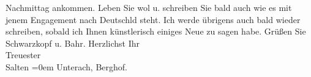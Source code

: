 \begin{ledgroupsized}[t]{13cm}
               Nachmittag ankommen. Leben Sie wol u. schreiben Sie bald auch wie es mit jenem
               Engagement nach Deutschld steht. \pend
           \pstart
           Ich werde übrigens auch bald wieder schreiben, sobald ich Ihnen künstlerisch ei{\pb}niges Neue zu sagen habe. Grüßen
               Sie Schwarzkopf u. Bahr.\pend
           \pstart
           Herzlichst Ihr {\\[\baselineskip]}Treuester {\\[\baselineskip]}\spacefill\mbox{Salten}\pend
           \leftskip=0em{}\pstart
           \noindent{}Unterach, Berghof. \pend
           
         
         \endnumbering{}\end{ledgroupsized}\begin{anhang}\end{anhang}\newcommand{\dateiname}{L03111}\newcommand{\titel}{Felix Salten an Arthur Schnitzler, 8. 8. 1892}\newcommand{\editorInnen}{Martin Anton Müller und Laura Untner}
      
